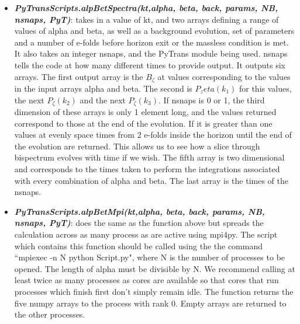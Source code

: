 \documentclass[10pt,
amsmath,amssymb,
aps,prd,nofootinbib,eqsecnum,a4paper]{revtex4}
\begin{document}
\begin{itemize}
\item { \it \bf PyTransScripts.alpBetSpectra(kt,alpha, beta, back, params, NB, nsnaps, PyT)}: takes in a value of kt, and two arrays defining a range of values of alpha and beta, as well as a background evolution, set of parameters and a number of e-folds before horizon exit or the massless condition is met. It also takes an integer nsnaps, and the PyTrans module being used. nsnaps  tells the code at how many different times to provide output. It outputs six arrays. The first output array is the $B_\zeta$ at values corresponding to the values in the input arrays alpha and beta. The second is $P_zeta(k_1)$ for this values, the next $P_\zeta(k_2)$ and the next $P_\zeta(k_3)$. If nsnaps is 0 or 1, the third dimension of these arrays is only 1 element long, and the values returned correspond to those at the end of the evolution. If it is greater than one values at evenly space times from 2 e-folds inside the horizon until the end of the evolution are 
returned. This allows us to see how a slice through bispectrum evolves with time if we wish. The fifth array is two dimensional 
and corresponds to the times taken to perform the integrations associated with every combination of alpha and beta. The last array is the 
times of the nsnaps.

\item { \it \bf PyTransScripts.alpBetMpi(kt,alpha, beta, back, params, NB, nsnaps, PyT)}: does the same as the function above but spreads the calculation across as many process as are active using mpi4py. The script which contains this function should be called using the the command ``mpiexec -n N python Script.py", where N is the number of processes to be opened. The length of alpha must be divisible by N. We recommend calling at least twice as many processes as cores are available so that cores that run processes which finish first don't simply remain idle.  The function returns the five numpy arrays to the process with rank 0. Empty arrays are returned to the other processes. 

\end{itemize}



\end{document}
